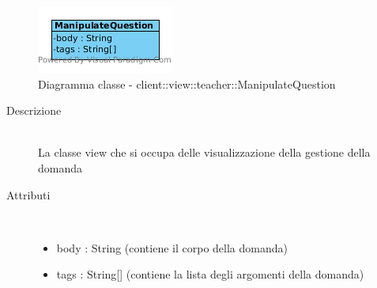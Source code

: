 \vspace{0.5cm}
\hypertarget{client::view::teacher::ManipulateQuestion}{}
\begin{center}
			\begin{figure}[H]
				\centering \includegraphics[scale=4, max width=\textwidth, max height=\myheight]{../img/diagrammiClassi/client/view/teacher/ManipulateQuestion.png}
				\caption{Diagramma classe - client::view::teacher::ManipulateQuestion}
			\end{figure}
		\end{center}\begin{description}
\item[Descrizione] \hfill \\
 La classe view che si occupa delle visualizzazione della gestione della domanda
\item[Attributi] \hfill \\
 \vspace{-7mm}
\begin{itemize}
\item body : String (contiene il corpo della domanda)
\item tags : String[] (contiene la lista degli argomenti della domanda)
\end{itemize}

\end{description}

